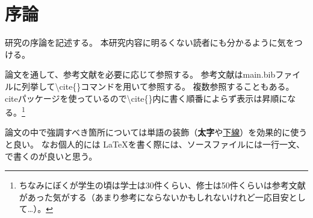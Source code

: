 \chapter{序論}\label{ch:introduction}

研究の序論を記述する。
本研究内容に明るくない読者にも分かるように気をつける。

論文を通して、参考文献を必要に応じて参照する\cite{bar:great2020coolname}。
参考文献はmain.bibファイルに列挙して{\textbackslash}cite\{\}コマンドを用いて参照する。
複数参照することもある\cite{bar:great2020coolname,garply:happy2021anothercoolname}。
citeパッケージを使っているので{\textbackslash}cite\{\}内に書く順番によらず表示は昇順になる\cite{garply:happy2021anothercoolname,bar:great2020coolname}。\footnote{ちなみにぼくが学生の頃は学士は30件くらい、修士は50件くらいは参考文献があった気がする（あまり参考にならないかもしれないけれど一応目安として…）。}

論文の中で強調すべき箇所については単語の装飾（\textbf{太字}や\underline{下線}）を効果的に使うと良い。
なお個人的には \LaTeX を書く際には、ソースファイルには一行一文、で書くのが良いと思う。